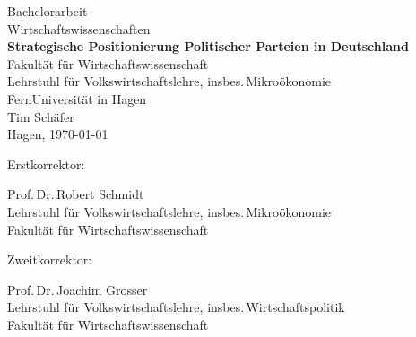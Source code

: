 \documentclass[twoside,12pt,a4paper]{report}
\begin{document}
 
\begin{titlepage}
 \begin{center}
  {\huge Bachelorarbeit\\Wirtschaftswissenschaften\\[1.5cm]}
  {\huge\bf Strategische Positionierung Politischer Parteien in Deutschland\\[3cm]}
  {\large Fakultät für Wirtschaftswissenschaft\\}
  {\large Lehrstuhl für Volkswirtschaftslehre, insbes.\,Mikroökonomie\\[1cm]}
  {\large FernUniversität in Hagen\\[3.5cm]}
  {\large Tim Schäfer\\[3cm]}
  {Hagen, \today} %
  \end{center}
\end{titlepage}


\thispagestyle{empty}
\vspace*{\fill}
\begin{minipage}{\textwidth}
\parbox[t][2cm][t]{3.5cm}{Erstkorrektor:}\hfill
\parbox[t][2cm][t]{11cm}{
	Prof.\,Dr.\,Robert Schmidt \\
	Lehrstuhl für Volkswirtschaftslehre, insbes.\,Mikroökonomie\\
	Fakultät für Wirtschaftswissenschaft
}
\parbox[t][2cm][t]{3.5cm}{Zweitkorrektor:}\hfill
\parbox[t][2cm][t]{11cm}{ %
	Prof.\,Dr.\,Joachim Grosser\\
	Lehrstuhl für Volkswirtschaftslehre, insbes.\,Wirtschaftspolitik\\
	Fakultät für Wirtschaftswissenschaft
}

\end{minipage}
\newpage


\setcounter{page}{1}

\end{document}
